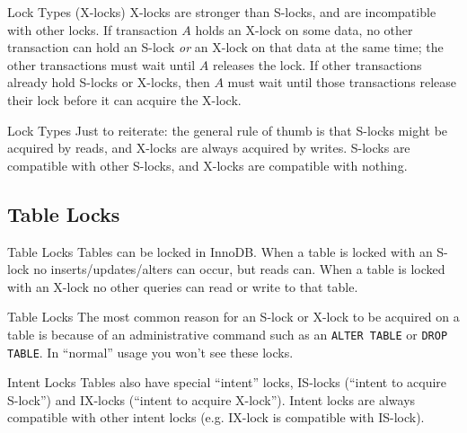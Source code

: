 \documentclass[14pt]{beamer}
\begin{document}
\begin{frame}{Lock Types (X-locks)}
  X-locks are stronger than S-locks, and are incompatible with other locks. If
  transaction $A$ holds an X-lock on some data, no other transaction can hold an
  S-lock \emph{or} an X-lock on that data at the same time; the other
  transactions must wait until $A$ releases the lock.
  \newline
  \newline
  If other transactions already hold S-locks or X-locks, then $A$ must wait
  until those transactions release their lock before it can acquire the X-lock.
\end{frame}

\begin{frame}{Lock Types}
  Just to reiterate: the general rule of thumb is that S-locks might be acquired
  by reads, and X-locks are always acquired by writes. S-locks are compatible
  with other S-locks, and X-locks are compatible with nothing.
\end{frame}

\subsection{Table Locks}

\begin{frame}{Table Locks}
  Tables can be locked in InnoDB. When a table is locked with an S-lock no
  inserts/updates/alters can occur, but reads can.
  \newline
  \newline
  When a table is locked with an X-lock no other queries can read or write to
  that table.
\end{frame}

\begin{frame}{Table Locks}
  The most common reason for an S-lock or X-lock to be acquired on a table is
  because of an administrative command such as an \texttt{ALTER TABLE} or
  \texttt{DROP TABLE}.
  \newline
  \newline
  In ``normal'' usage you won't see these locks.
\end{frame}

\begin{frame}{Intent Locks}
  Tables also have special ``intent'' locks, IS-locks (``intent to acquire
  S-lock'') and IX-locks (``intent to acquire X-lock'').
  \newline
  \newline
  Intent locks are always compatible with other intent locks (e.g. IX-lock is
  compatible with IS-lock).
\end{frame}
\end{document}
